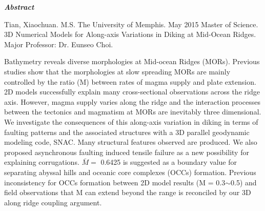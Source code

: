 \begin{center}
\textbf{\textit{\large{Abstract}}}
\end{center}

\vspace{0.5cm}

\begin{singlespace*}
Tian, Xiaochuan. M.S. The University of Memphis. May 2015 Master of Science. 3D Numerical Models for Along-axis Variations in Diking at Mid-Ocean Ridges. Major Professor: Dr. Eunseo Choi.
\end{singlespace*}

\vspace{0.5cm}

Bathymetry reveals diverse morphologies at Mid-ocean Ridges (MORs). Previous studies show that the morphologies at slow spreading MORs are mainly controlled by the ratio (M) between rates of magma supply and plate extension. 2D models successfully explain many cross-sectional observations across the ridge axis. However, magma supply varies along the ridge and the interaction processes between the tectonics and magmatism at MORs are inevitably three dimensional. We investigate the consequences of this along-axis variation in diking in terms of faulting patterns and the associated structures with a 3D parallel geodynamic modeling code, SNAC. Many structural features observed are produced. We also proposed asynchronous faulting induced tensile failure as a new possibility for explaining corrugations. $\bar{M} =$ 0.6425 is suggested as a boundary value for separating abyssal hills and oceanic core complexes (OCCs) formation. Previous inconsistency for OCCs formation between 2D model results (M = 0.3$\sim$0.5) and field observations that M can extend beyond the range is reconciled by our 3D along ridge coupling argument.  

